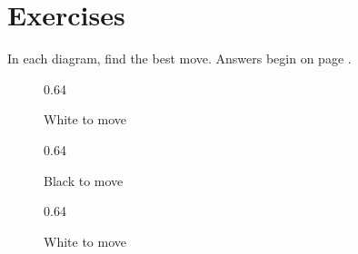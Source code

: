 \documentclass[a4paper,12pt]{book}
\newcommand{\scalefactorthreeup}{0.64}
\begin{document}
\clearpage
\section*{Exercises}
\addtolength{\belowcaptionskip}{8pt}
\captionsetup{figurename=Exercise}\setcounter{figure}{0}
In each diagram, find the best move. Answers begin on page \pageref{answersc2}.

\begin{figure}[h]
\begin{center}
\begin{minipage}[t]{.32\textwidth}
\begin{othelloboard}{\scalefactorthreeup}
\dotmarkings
{}
\end{othelloboard}
\caption{White to move}
\end{minipage}
\hfill
\begin{minipage}[t]{.32\textwidth}
\begin{othelloboard}{\scalefactorthreeup}
\dotmarkings
{}
\end{othelloboard}
\caption{Black to move}
\end{minipage}
\hfill
\begin{minipage}[t]{.32\textwidth}
\begin{othelloboard}{\scalefactorthreeup}
\dotmarkings
{}
\end{othelloboard}
\caption{White to move}
\end{minipage}
\end{center}
\end{figure}
\end{document}
